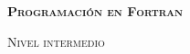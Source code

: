 \begin{noindented}
  {
    \huge\bfseries
    \textsf{%
      \textsc{Programación en Fortran}
    }
  }
  \par
  {
    \large
    \textsf{%
      \textsc{Nivel intermedio}
    }
  }
  \vspace{1em}
\end{noindented}
